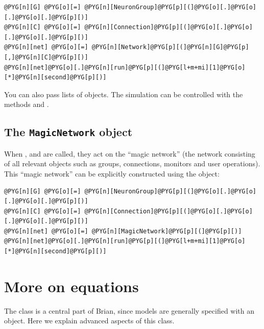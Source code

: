\documentclass[letterpaper,10pt,english]{manual}
\begin{document}
\begin{Verbatim}[commandchars=@\[\]]
@PYG[n][G] @PYG[o][=] @PYG[n][NeuronGroup]@PYG[p][(]@PYG[o][.]@PYG[o][.]@PYG[o][.]@PYG[p][)]
@PYG[n][C] @PYG[o][=] @PYG[n][Connection]@PYG[p][(]@PYG[o][.]@PYG[o][.]@PYG[o][.]@PYG[p][)]
@PYG[n][net] @PYG[o][=] @PYG[n][Network]@PYG[p][(]@PYG[n][G]@PYG[p][,]@PYG[n][C]@PYG[p][)]
@PYG[n][net]@PYG[o][.]@PYG[n][run]@PYG[p][(]@PYG[l+m+mi][1]@PYG[o][*]@PYG[n][second]@PYG[p][)]
\end{Verbatim}

You can also pass lists of objects. The simulation can be controlled with the methods
 and .


\subsection{The \texttt{MagicNetwork} object}

When \hyperlink{brian.run}{}, \hyperlink{brian.reinit}{} and \hyperlink{brian.stop}{} are called, they act on the ``magic network'' (the network
consisting of all relevant objects such as groups, connections, monitors and user operations). This ``magic
network'' can be explicitly constructed using the \hyperlink{brian.MagicNetwork}{} object:

\begin{Verbatim}[commandchars=@\[\]]
@PYG[n][G] @PYG[o][=] @PYG[n][NeuronGroup]@PYG[p][(]@PYG[o][.]@PYG[o][.]@PYG[o][.]@PYG[p][)]
@PYG[n][C] @PYG[o][=] @PYG[n][Connection]@PYG[p][(]@PYG[o][.]@PYG[o][.]@PYG[o][.]@PYG[p][)]
@PYG[n][net] @PYG[o][=] @PYG[n][MagicNetwork]@PYG[p][(]@PYG[p][)]
@PYG[n][net]@PYG[o][.]@PYG[n][run]@PYG[p][(]@PYG[l+m+mi][1]@PYG[o][*]@PYG[n][second]@PYG[p][)]
\end{Verbatim}

\resetcurrentobjects
\hypertarget{--doc-equations}{}

\hypertarget{moreonequations}{}\section{More on equations}

The \hyperlink{brian.Equations}{} class is a central part of Brian, since
models are generally specified with an \hyperlink{brian.Equations}{} object.
Here we explain advanced aspects of this class.
\end{document}
